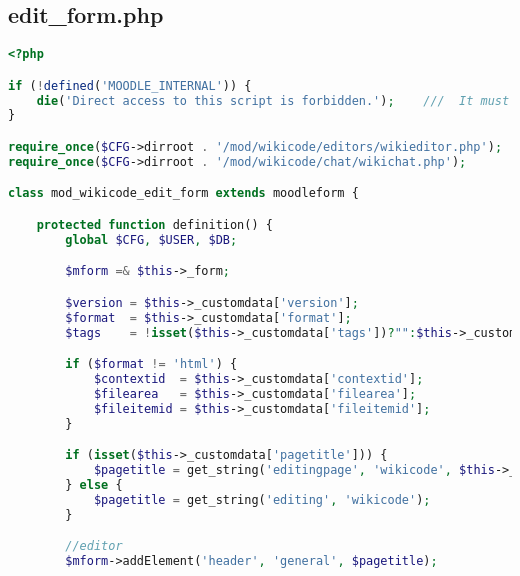 \subsection{edit\_form.php}
\begin{lstlisting}[language=PHP]
<?php

if (!defined('MOODLE_INTERNAL')) {
    die('Direct access to this script is forbidden.');    ///  It must be included from a Moodle page
}

require_once($CFG->dirroot . '/mod/wikicode/editors/wikieditor.php');
require_once($CFG->dirroot . '/mod/wikicode/chat/wikichat.php');

class mod_wikicode_edit_form extends moodleform {

    protected function definition() {
        global $CFG, $USER, $DB;

        $mform =& $this->_form;

        $version = $this->_customdata['version'];
        $format  = $this->_customdata['format'];
        $tags    = !isset($this->_customdata['tags'])?"":$this->_customdata['tags'];

        if ($format != 'html') {
            $contextid  = $this->_customdata['contextid'];
            $filearea   = $this->_customdata['filearea'];
            $fileitemid = $this->_customdata['fileitemid'];
        }

        if (isset($this->_customdata['pagetitle'])) {
            $pagetitle = get_string('editingpage', 'wikicode', $this->_customdata['pagetitle']);
        } else {
            $pagetitle = get_string('editing', 'wikicode');
        }

        //editor
        $mform->addElement('header', 'general', $pagetitle);


\end{lstlisting}
